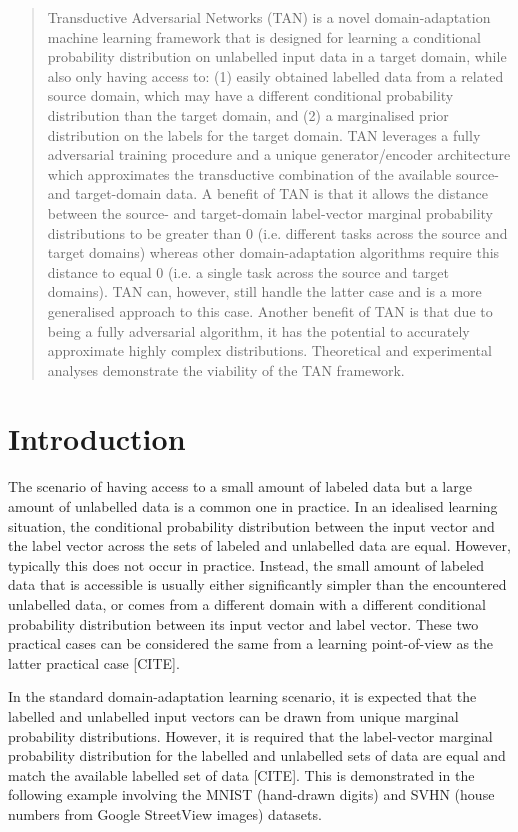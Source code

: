 \documentclass{article}
\begin{document}
\begin{abstract}
Transductive Adversarial Networks (TAN) is a novel domain-adaptation machine learning framework that is designed for learning a conditional probability distribution on unlabelled input data in a target domain, while also only having access to: (1) easily obtained labelled data from a related source domain, which may have a different conditional probability distribution than the target domain, and (2) a marginalised prior distribution on the labels for the target domain. TAN leverages a fully adversarial training procedure and a unique generator/encoder architecture which approximates the transductive combination of the available source- and target-domain data. A benefit of TAN is that it allows the distance between the source- and target-domain label-vector marginal probability distributions to be greater than 0 (i.e. different tasks across the source and target domains) whereas other domain-adaptation algorithms require this distance to equal 0 (i.e. a single task across the source and target domains). TAN can, however, still handle the latter case and is a more generalised approach to this case. Another benefit of TAN is that due to being a fully adversarial algorithm, it has the potential to accurately approximate highly complex distributions. Theoretical and experimental analyses demonstrate the viability of the TAN framework.
\end{abstract}

\section{Introduction}

The scenario of having access to a small amount of labeled data but a large amount of unlabelled data is a common one in practice. In an idealised learning situation, the conditional probability distribution between the input vector and the label vector across the sets of labeled and unlabelled data are equal. However, typically this does not occur in practice. Instead, the small amount of labeled data that is accessible is usually either significantly simpler than the encountered unlabelled data, or comes from a different domain with a different conditional probability distribution between its input vector and label vector. These two practical cases can be considered the same from a learning point-of-view as the latter practical case [CITE]. 

In the standard domain-adaptation learning scenario, it is expected that the labelled and unlabelled input vectors can be drawn from unique marginal probability distributions. However, it is required that the label-vector marginal probability distribution for the labelled and unlabelled sets of data are equal and match the available labelled set of data [CITE]. This is demonstrated in the following example involving the MNIST (hand-drawn digits) and SVHN (house numbers from Google StreetView images) datasets.
\end{document}
